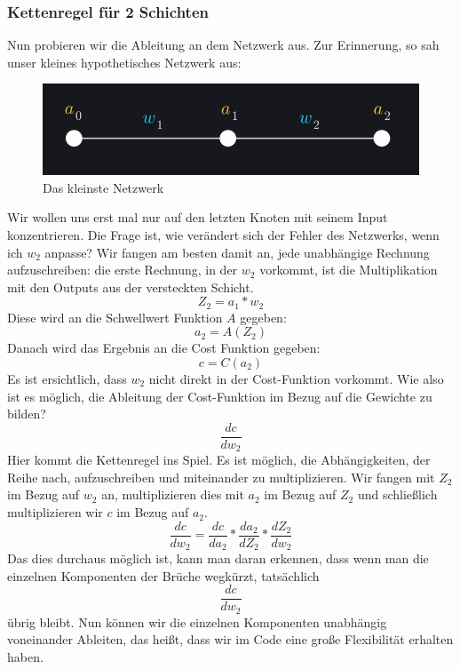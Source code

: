 \documentclass[12pt]{article}
\begin{document}
\subsubsection{Kettenregel für 2 Schichten}
Nun probieren wir die Ableitung an dem Netzwerk aus. Zur Erinnerung, so sah unser kleines hypothetisches Netzwerk aus:
\begin{figure}[H]
\centering
\includegraphics[scale=0.40]{./Images/Pasted image 20230912184748.png}
\caption{Das kleinste Netzwerk}
\label{Das kleinste Netzwerk}
\end{figure}
Wir wollen uns erst mal nur auf den letzten Knoten mit seinem Input konzentrieren. Die Frage ist, wie verändert sich der Fehler des Netzwerks, wenn ich $w_2$ anpasse?
Wir fangen am besten damit an, jede unabhängige Rechnung aufzuschreiben:
die erste Rechnung, in der $w_2$ vorkommt, ist die Multiplikation mit den Outputs aus der versteckten Schicht.
$$Z_2 = a_1*w_2$$
Diese wird an die Schwellwert Funktion $A$ gegeben:
$$a_2 = A(Z_2)$$
Danach wird das Ergebnis an die Cost Funktion gegeben:
$$c=C(a_2)$$
Es ist ersichtlich, dass $w_2$ nicht direkt in der Cost-Funktion vorkommt. Wie also ist es möglich, die Ableitung der Cost-Funktion im Bezug auf die Gewichte zu bilden?
$$\frac{dc}{dw_2}$$
Hier kommt die Kettenregel ins Spiel. Es ist möglich, die Abhängigkeiten, der Reihe nach, aufzuschreiben und miteinander zu multiplizieren. 
Wir fangen mit $Z_2$ im Bezug auf $w_2$ an, multiplizieren dies mit $a_2$ im Bezug auf $Z_2$ und schließlich multiplizieren wir $c$ im Bezug auf $a_2$.
$$\frac{ dc }{ dw_{ 2 } }=
\frac{ dc }{ da_{ 2 } }*
\frac{ da_{ 2 } }{ dZ_{ 2 } }*
\frac{ dZ_{ 2 } }{ dw_{ 2 } }$$
Das dies durchaus möglich ist, kann man daran erkennen, dass wenn man die einzelnen Komponenten der Brüche wegkürzt, tatsächlich $$\frac{ dc }{ dw_{ 2 } }$$  übrig bleibt.
Nun können wir die einzelnen Komponenten unabhängig voneinander Ableiten, das heißt, dass wir im Code eine große Flexibilität erhalten haben.
\end{document}
